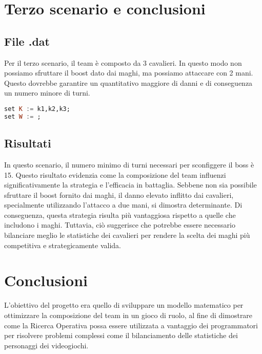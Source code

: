\documentclass[12pt]{article}
\begin{document}
\section{Terzo scenario e conclusioni}
\subsection{File .dat}
Per il terzo scenario, il team è composto da 3 cavalieri. In questo modo non possiamo sfruttare il boost dato dai maghi, ma possiamo attaccare con 2 mani. Questo dovrebbe garantire un quantitativo maggiore di danni e di conseguenza un numero minore di turni.
\begin{lstlisting}[language=haskell, frame=single, captionpos=b, keywordstyle=\color{purple}]
set K := k1,k2,k3;
set W := ;
\end{lstlisting}
\subsection{Risultati}
In questo scenario, il numero minimo di turni necessari per sconfiggere il boss è 15. Questo risultato evidenzia come la composizione del team influenzi significativamente la strategia e l'efficacia in battaglia. Sebbene non sia possibile sfruttare il boost fornito dai maghi, il danno elevato inflitto dai cavalieri, specialmente utilizzando l'attacco a due mani, si dimostra determinante. Di conseguenza, questa strategia risulta più vantaggiosa rispetto a quelle che includono i maghi. Tuttavia, ciò suggerisce che potrebbe essere necessario bilanciare meglio le statistiche dei cavalieri per rendere la scelta dei maghi più competitiva e strategicamente valida.
\section{Conclusioni}
L'obiettivo del progetto era quello di sviluppare un modello matematico per ottimizzare la composizione del team in un gioco di ruolo, al fine di dimostrare come la Ricerca Operativa possa essere utilizzata a vantaggio dei programmatori per risolvere problemi complessi come il bilanciamento delle statistiche dei personaggi dei videogiochi.
\end{document}
